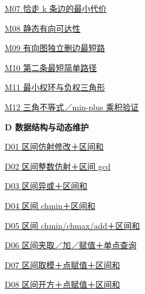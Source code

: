 \documentclass[10pt,a4paper]{article}
\begin{document}
\noindent\hyperref[M07]{M07 恰走 k 条边的最小代价\nobreak\hfill\pageref*{M07}}\par\vspace{1.5pt}
\noindent\hyperref[M08]{M08 静态有向可达性\nobreak\hfill\pageref*{M08}}\par\vspace{1.5pt}
\noindent\hyperref[M09]{M09 有向图独立删边最短路\nobreak\hfill\pageref*{M09}}\par\vspace{1.5pt}
\noindent\hyperref[M10]{M10 第二条最短简单路径\nobreak\hfill\pageref*{M10}}\par\vspace{1.5pt}
\noindent\hyperref[M11]{M11 最小权环与负权三角形\nobreak\hfill\pageref*{M11}}\par\vspace{1.5pt}
\noindent\hyperref[M12]{M12 三角不等式／min-plus 乘积验证\nobreak\hfill\pageref*{M12}}\par\vspace{1.5pt}
\par\vspace{6pt}\textbf{D 数据结构与动态维护}\par\vspace{3pt}
\noindent\hyperref[D01]{D01 区间仿射修改＋区间和\nobreak\hfill\pageref*{D01}}\par\vspace{1.5pt}
\noindent\hyperref[D02]{D02 区间整数仿射＋区间 gcd\nobreak\hfill\pageref*{D02}}\par\vspace{1.5pt}
\noindent\hyperref[D03]{D03 区间异或＋区间和\nobreak\hfill\pageref*{D03}}\par\vspace{1.5pt}
\noindent\hyperref[D04]{D04 区间 chmin＋区间和\nobreak\hfill\pageref*{D04}}\par\vspace{1.5pt}
\noindent\hyperref[D05]{D05 区间 chmin/chmax/add＋区间和\nobreak\hfill\pageref*{D05}}\par\vspace{1.5pt}
\noindent\hyperref[D06]{D06 区间夹取／加／赋值＋单点查询\nobreak\hfill\pageref*{D06}}\par\vspace{1.5pt}
\noindent\hyperref[D07]{D07 区间取模＋点赋值＋区间和\nobreak\hfill\pageref*{D07}}\par\vspace{1.5pt}
\noindent\hyperref[D08]{D08 区间开方＋点赋值＋区间和\nobreak\hfill\pageref*{D08}}\par\vspace{1.5pt}
\end{document}
